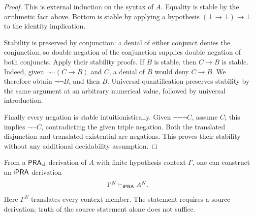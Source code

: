 \begin{proof}
This is external induction on the syntax of \(A\). Equality is stable by
the arithmetic fact above. Bottom is stable by applying a hypothesis
\((\bot\to\bot)\to\bot\) to the identity implication.

Stability is preserved by conjunction: a denial of either conjunct denies
the conjunction, so double negation of the conjunction supplies double
negation of both conjuncts. Apply their stability proofs.
If \(B\) is stable, then \(C\to B\) is stable. Indeed, given
\(\neg\neg(C\to B)\) and \(C\), a denial of \(B\) would deny
\(C\to B\). We therefore obtain \(\neg\neg B\), and then \(B\).
Universal quantification preserves stability by the same argument at an
arbitrary numerical value, followed by universal introduction.

Finally every negation is stable intuitionistically. Given
\(\neg\neg\neg C\), assume \(C\); this implies \(\neg\neg C\),
contradicting the given triple negation. Both the translated disjunction
and translated existential are negations. This proves their stability
without any additional decidability assumption.
\end{proof}

\begin{theorem}
\label{thm:negative-transfer}
From a \(\mathsf{PRA}_{\mathrm{cl}}\) derivation of \(A\) with finite hypothesis context
\(\Gamma\), one can construct an \(\mathsf{iPRA}\) derivation
\[
 \Gamma^N\vdash_{\mathsf{iPRA}} A^N.
\]
Here \(\Gamma^N\) translates every context member. The statement requires
a source derivation; truth of the source statement alone does not suffice.
\end{theorem}

